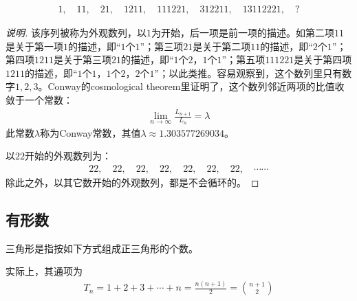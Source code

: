 \begin{example}
  \begin{align*}
    1,\quad 11,\quad 21,\quad 1211,\quad 111221,\quad 312211,\quad 13112221,\quad ?
  \end{align*}
\end{example}
\begin{proof}[说明]
  该序列被称为外观数列，以$1$为开始，后一项是前一项的描述。如第二项$11$是关于第一项$1$的描述，即“$1$个$1$”；第三项$21$是关于第二项$11$的描述，即“$2$个$1$”；第四项$1211$是关于第三项$21$的描述，即“$1$个$2$，$1$个$1$”；第五项$111221$是关于第四项$1211$的描述，即“$1$个$1$，$1$个$2$，$2$个$1$”；以此类推。容易观察到，这个数列里只有数字$1,2,3$。Conway的cosmological theorem里证明了，这个数列邻近两项的比值收敛于一个常数：
  \begin{align*}
    \lim_{n\to\infty}\frac{L_{n+1}}{L_n}=\lambda
  \end{align*}
  此常数$\lambda$称为Conway常数，其值$\lambda\approx 1.303577269034$。

  以$22$开始的外观数列为：
  \begin{align*}
    22,\quad 22,\quad 22,\quad 22,\quad 22,\quad 22,\quad 22,\quad \cdots\cdots
  \end{align*}
  除此之外，以其它数开始的外观数列，都是不会循环的。
\end{proof}

\subsection{有形数}
\label{sec:figurate-number}

\begin{example}三角形是指按如下方式组成正三角形的个数。
  \begin{center}\normalfont
  \end{center}
  实际上，其通项为
  \begin{align*}
    T_n=1 + 2 + 3 + \cdots + n = \frac{n(n+1)}{2}=\binom{n+1}{2}
  \end{align*}
\end{example}

